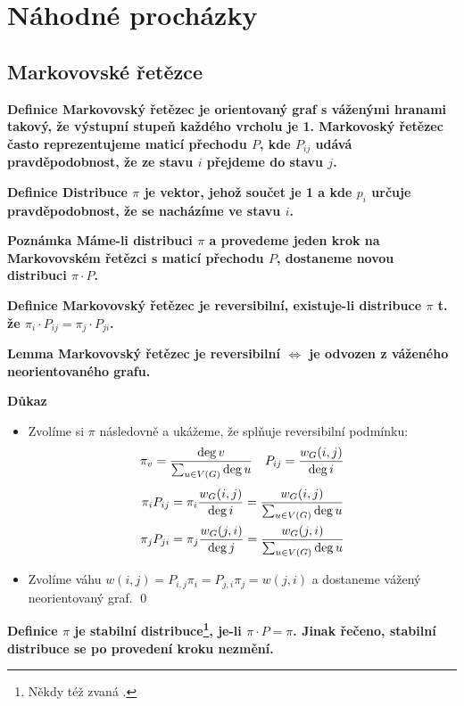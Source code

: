 \documentclass[a4paper,12pt,titlepage]{article}
\newcommand{\lm}{\smallskip\noindent\bf Lemma\rm{} }
\newcommand{\dk}{\smallskip\noindent\bf Důkaz\rm{} }
\newcommand{\df}{\smallskip\noindent\bf Definice\rm{} }
\newcommand{\pzn}{\smallskip\noindent\bf Poznámka\rm{} }
\begin{document}
\section{Náhodné procházky}
\subsection{Markovovské řetězce}

\df Markovovský řetězec je orientovaný graf s váženými hranami takový, že
výstupní stupeň každého vrcholu je 1. Markovoský řetězec často reprezentujeme
maticí přechodu $P$, kde $P_{ij}$ udává pravděpodobnost, že ze stavu $i$
přejdeme do stavu $j$.

\df Distribuce $\pi$ je vektor, jehož součet je 1 a kde $p_i$ určuje
pravděpodobnost, že se nacházíme ve stavu $i$.

\pzn Máme-li distribuci $\pi$ a provedeme jeden krok na Markovovském řetězci s
maticí přechodu $P$, dostaneme novou distribuci $\pi\cdot P$.

\df Markovovský řetězec je reversibilní, existuje-li distribuce $\pi$
t. že $\pi_i\cdot P_{ij} = \pi_j\cdot P_{ji}$.

\lm Markovovský řetězec je reversibilní $\Leftrightarrow$ je odvozen z váženého neorientovaného grafu.

\dk 
\begin{itemize}

\item[\uv{$\Leftarrow$}]
Zvolíme si $\pi$ následovně a ukážeme, že splňuje reversibilní podmínku:
\begin{align*}
& \pi_v = {\deg v\over \sum_{u\in V(G)} \deg u} & P_{ij} = {w_G(i,j)\over \deg i} \\ 
\end{align*}
\begin{align*}
\pi_i P_{ij} &= \pi_i {w_G(i,j)\over \deg i} = {w_G(i,j)\over \sum_{u\in V(G)}\deg u} \\
\pi_j P_{ji} &= \pi_j {w_G(j,i)\over \deg j} = {w_G(j,i)\over \sum_{u\in V(G)}\deg u}
\end{align*}

\item[\uv{$\Rightarrow$}]
Zvolíme váhu $w(i,j) = P_{i,j}\pi_i = P_{j,i}\pi_j = w(j,i)$ a dostaneme vážený
neorientovaný graf.
\qed
\end{itemize}

\df $\pi$ je stabilní distribuce\footnote{Někdy též zvaná .},
je-li $\pi\cdot P = \pi$. Jinak řečeno, stabilní distribuce se po provedení
kroku nezmění.
\end{document}

